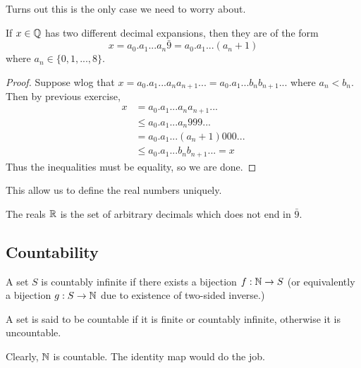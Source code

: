 \documentclass[11pt]{article}
\begin{document}
Turns out this is the only case we need to worry about.
\begin{proposition}
  If \(x\in\mathbb{Q}\) has two different decimal expansions, then they are of the form
  \[x=a_0.a_1...a_n\bar{9}=a_0.a_1...(a_n+1)\]
  where \(a_n\in\{0,1,...,8\}\).
\end{proposition}
\begin{proof}
  Suppose wlog that \(x=a_0.a_1...a_na_{n+1}...=a_0.a_1...b_nb_{n+1}...\) where \(a_n<b_n\).
  Then by previous exercise,
  \begin{align*}
    x &= a_0.a_1...a_na_{n+1}... \\
      &\leq a_0.a_1...a_n999... \\
      &= a_0.a_1...(a_n+1)000... \\
      &\leq a_0.a_1...b_nb_{n+1}... = x
  \end{align*}
  Thus the inequalities must be equality, so we are done.
\end{proof}

This allow us to define the real numbers uniquely.
\begin{definition}
  The reals \(\mathbb{R}\) is the set of arbitrary decimals which does not end in \(\bar{9}\).
\end{definition}

\subsection{Countability}
\begin{definition}
  A set \(S\) is countably infinite if there exists a bijection \(f:\mathbb{N} \to S\) (or equivalently a bijection \(g:S \to \mathbb{N}\) due to existence of two-sided inverse.)

  \vspace{5pt}A set is said to be countable if it is finite or countably infinite, otherwise it is uncountable.
\end{definition}
Clearly, \(\mathbb{N}\) is countable. The identity map would do the job.
\end{document}
